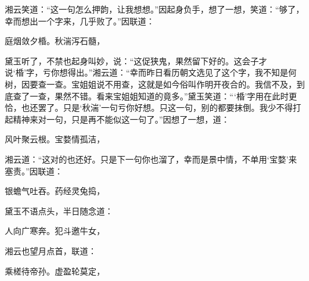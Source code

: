 \begin{parag}
    湘云笑道：“这一句怎么押韵，让我想想。”因起身负手，想了一想，笑道：“够了，幸而想出一个字来，几乎败了。”因联道：
\end{parag}


\begin{poem}
    \begin{pl}

        庭烟敛夕棔。秋湍泻石髓，
    \end{pl}
\end{poem}


\begin{parag}
    黛玉听了，不禁也起身叫妙，说：“这促狭鬼，果然留下好的。这会子才说‘棔’字，亏你想得出。”湘云道：“幸而昨日看历朝文选见了这个字，我不知是何树，因要查一查。宝姐姐说不用查，这就是如今俗叫作明开夜合的。我信不及，到底查了一查，果然不错。看来宝姐姐知道的竟多。”黛玉笑道：“‘棔’字用在此时更恰，也还罢了。只是‘秋湍’一句亏你好想。只这一句，别的都要抹倒。我少不得打起精神来对一句，只是再不能似这一句了。”因想了一想，道：
\end{parag}


\begin{poem}
    \begin{pl}
        风叶聚云根。宝婺情孤洁，
    \end{pl}
\end{poem}


\begin{parag}
    湘云道：“这对的也还好。只是下一句你也溜了，幸而是景中情，不单用‘宝婺’来塞责。”因联道：
\end{parag}
\begin{poem}
    \begin{pl}
        银蟾气吐吞。药经灵兔捣，
    \end{pl}
\end{poem}


\begin{parag}
    黛玉不语点头，半日随念道：
\end{parag}
\begin{poem}
    \begin{pl}
        人向广寒奔。犯斗邀牛女，
    \end{pl}
\end{poem}


\begin{parag}
    湘云也望月点首，联道：
\end{parag}
\begin{poem}
    \begin{pl}
        乘槎待帝孙。虚盈轮莫定，
    \end{pl}
\end{poem}


